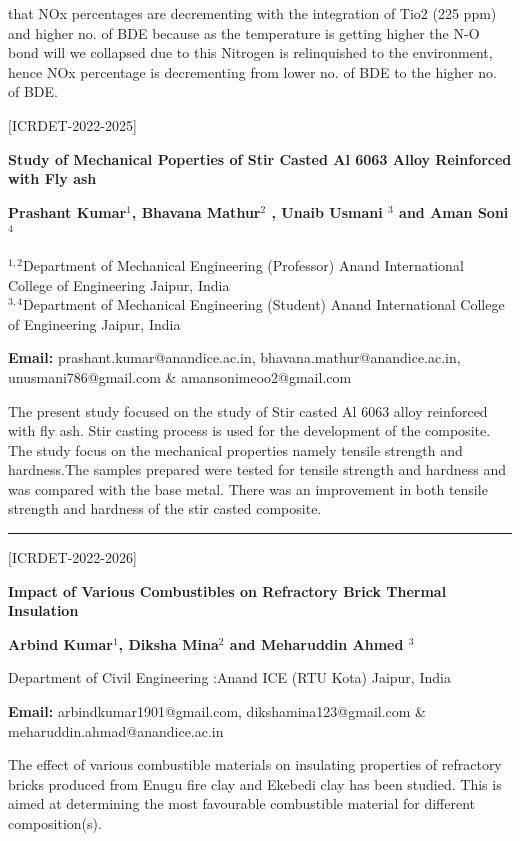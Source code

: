 \documentclass[twoside,11pt]{amsart}
\begin{document}
that NOx percentages are decrementing with the integration of Tio2 (225 ppm) and
higher no. of BDE because as the temperature is getting higher the N-O bond will we
collapsed due to this Nitrogen is relinquished to the environment, hence NOx
percentage is decrementing from lower no. of BDE to the higher no. of BDE.
\newpage
\vskip 5mm
\begin{flushleft}
\centerline{[ICRDET-2022-2025]}
\end{flushleft}
\begin{center}\bf\LARGE
Study of Mechanical Poperties of Stir Casted Al 6063 Alloy Reinforced with Fly ash
\end{center}
\vskip 5mm
\centerline{\textbf{ Prashant Kumar$^{1}$, Bhavana Mathur$^{2}$ , Unaib Usmani
$^{3}$  and Aman Soni$^{4}$ }}
\vskip 5mm
\begin{flushleft}
$^{1,2}$Department of Mechanical Engineering (Professor) Anand International College of Engineering Jaipur, India\\
$^{3,4}$Department of Mechanical Engineering (Student) Anand International College of Engineering Jaipur, India
\vskip 5mm
\end{flushleft}
\vskip 2mm
\begin{flushleft}
{\bf Email:} prashant.kumar@anandice.ac.in, bhavana.mathur@anandice.ac.in, unusmani786@gmail.com \& amansonimeoo2@gmail.com
\end{flushleft}
\vskip 5mm
The present study focused on the study of Stir
casted Al 6063 alloy reinforced with fly ash. Stir casting
process is used for the development of the composite. The study
focus on the mechanical properties namely tensile strength and
hardness.The samples prepared were tested for tensile strength
and hardness and was compared with the base metal. There
was an improvement in both tensile strength and hardness of
the stir casted composite.
\vskip 2mm
\rule{\textwidth}{0.5pt}
\vskip 5mm
\begin{flushleft}
\centerline{[ICRDET-2022-2026]}
\end{flushleft}
\begin{center}\bf\LARGE
Impact of Various Combustibles on Refractory
Brick Thermal Insulation
\end{center}
\vskip 5mm

\centerline{\textbf{Arbind Kumar$^{1}$, Diksha Mina$^{2}$ and Meharuddin Ahmed
$^{3}$   }}
\vskip 5mm
\begin{flushleft}
Department of Civil Engineering :Anand ICE
(RTU Kota)
Jaipur, India
\vskip 5mm
\end{flushleft}
\vskip 2mm
\begin{flushleft}
{\bf Email:} arbindkumar1901@gmail.com, dikshamina123@gmail.com \& meharuddin.ahmad@anandice.ac.in
\end{flushleft}
\vskip 5mm
The effect of various combustible materials on insulating properties of refractory bricks
produced from Enugu fire clay and Ekebedi clay has been studied. This is aimed at determining the most
favourable combustible material for different composition(s).
\vskip 2mm
\newpage
\end{document}
